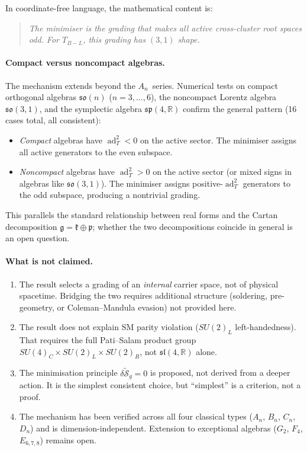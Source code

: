 \documentclass[11pt]{article}
\theoremstyle{plain}
\theoremstyle{definition}
\theoremstyle{remark}
\newcommand{\sln}[1]{\mathfrak{sl}(#1,\mathbb{R})}
\newcommand{\TBL}{T_{B\!-\!L}}
\newcommand{\ad}{\operatorname{ad}}
\begin{document}
In coordinate-free language, the mathematical content is:
\begin{quote}
\emph{The minimiser is the grading that makes all active
cross-cluster root spaces odd.  For $\TBL$, this grading has
$(3,1)$ shape.}
\end{quote}

\paragraph{Compact versus noncompact algebras.}
The mechanism extends beyond the $A_n$~series.  Numerical tests
on compact orthogonal algebras $\mathfrak{so}(n)$ ($n = 3, \ldots, 6$),
the noncompact Lorentz algebra $\mathfrak{so}(3,1)$, and the
symplectic algebra $\mathfrak{sp}(4,\mathbb{R})$ confirm the
general pattern (16 cases total, all consistent):
\begin{itemize}\itemsep0pt
  \item \emph{Compact} algebras have $\ad_T^2 < 0$ on the active
    sector.  The minimiser assigns all active generators to the
    even subspace.
  \item \emph{Noncompact} algebras have $\ad_T^2 > 0$ on the active
    sector (or mixed signs in algebras like $\mathfrak{so}(3,1)$).
    The minimiser assigns positive-$\ad_T^2$ generators to the odd
    subspace, producing a nontrivial grading.
\end{itemize}
This parallels the standard relationship between real forms and
the Cartan decomposition $\mathfrak{g} = \mathfrak{k}
\oplus \mathfrak{p}$; whether the two
decompositions coincide in general is an open question.

\paragraph{What is not claimed.}
\begin{enumerate}\itemsep0pt
  \item The result selects a grading of an \emph{internal} carrier
    space, not of physical spacetime.  Bridging the two requires
    additional structure (soldering, pre-geometry, or Coleman--Mandula
    evasion) not provided here.
  \item The result does not explain SM parity violation ($SU(2)_L$
    left-handedness).  That requires the full Pati--Salam product
    group $SU(4)_C \times SU(2)_L \times SU(2)_R$, not
    $\sln{4}$ alone.
  \item The minimisation principle $\delta\widetilde{\mathcal{S}}_g = 0$ is
    proposed, not derived from a deeper action.  It is the simplest
    consistent choice, but ``simplest'' is a criterion, not a proof.
  \item The mechanism has been verified across all four classical
    types ($A_n$, $B_n$, $C_n$, $D_n$) and is dimension-independent.
    Extension to exceptional algebras ($G_2$, $F_4$, $E_{6,7,8}$)
    remains open.
\end{enumerate}
\end{document}
